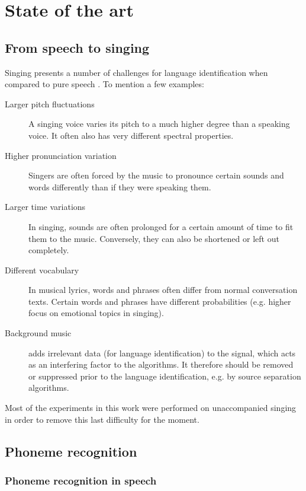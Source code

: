 \chapter{State of the art}	\label{chap:sota}
\section{From speech to singing}
Singing presents a number of challenges for language identification when compared to pure speech \cite{goto_alignment}. To mention a few examples:
\begin{description}
 \item[Larger pitch fluctuations] A singing voice varies its pitch to a much higher degree than a speaking voice. It often also has very different spectral properties.
 \item[Higher pronunciation variation] Singers are often forced by the music to pronounce certain sounds and words differently than if they were speaking them.
 \item[Larger time variations] In singing, sounds are often prolonged for a certain amount of time to fit them to the music. Conversely, they can also be shortened or left out completely.
 \item[Different vocabulary] In musical lyrics, words and phrases often differ from normal conversation texts. Certain words and phrases have different probabilities (e.g. higher focus on emotional topics in singing).
 \item[Background music] adds irrelevant data (for language identification) to the signal, which acts as an interfering factor to the algorithms. It therefore should be removed or suppressed prior to the language identification, e.g. by source separation algorithms.
 \end{description}
Most of the experiments in this work were performed on unaccompanied singing in order to remove this last difficulty for the moment.

\section{Phoneme recognition}
\subsection{Phoneme recognition in speech}
